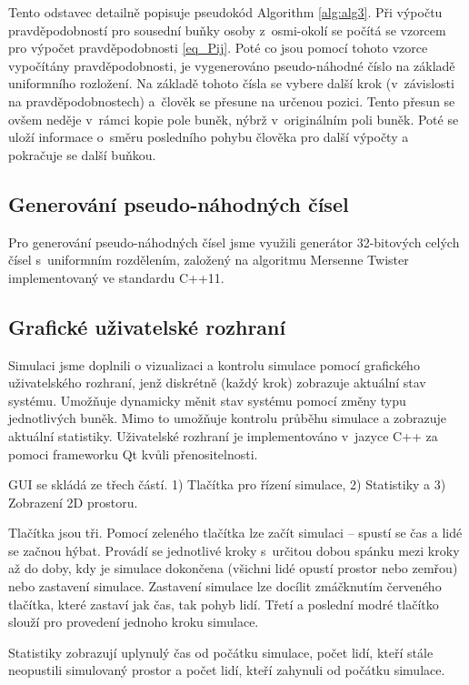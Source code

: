 \documentclass[11pt, titlepage, a4paper]{article}
\begin{document}
    Tento odstavec detailně popisuje pseudokód Algorithm \ref{alg:alg3}. Při výpočtu pravděpodobností pro sousední buňky osoby z~osmi-okolí se počítá se vzorcem pro výpočet pravděpodobnosti \ref{eq_Pij}. Poté co jsou pomocí tohoto vzorce vypočítány pravděpodobnosti, je vygenerováno pseudo-náhodné číslo na základě uniformního rozložení. Na základě tohoto čísla se vybere další krok (v~závislosti na pravděpodobnostech) a~člověk se přesune na určenou pozici. Tento přesun se ovšem neděje v~rámci kopie pole buněk, nýbrž v~originálním poli buněk. Poté se uloží informace o~směru posledního pohybu člověka pro další výpočty a pokračuje se další buňkou.
    
    
    \subsection{Generování pseudo-náhodných čísel}
    Pro generování pseudo-náhodných čísel jsme využili generátor 32-bitových celých čísel s~uniformním rozdělením, založený na algoritmu Mersenne Twister implementovaný ve standardu C++11.

    \subsection{Grafické uživatelské rozhraní}
    Simulaci jsme doplnili o vizualizaci a kontrolu simulace pomocí grafického uživatelského rozhraní, jenž diskrétně (každý krok) zobrazuje aktuální stav systému. Umožňuje dynamicky měnit stav systému pomocí změny typu jednotlivých buněk. Mimo to umožňuje kontrolu průběhu simulace a zobrazuje aktuální statistiky. Uživatelské rozhraní je implementováno v~jazyce C++ za pomoci frameworku Qt kvůli přenositelnosti.
    
    GUI se skládá ze třech částí. 1) Tlačítka pro řízení simulace, 2) Statistiky a 3) Zobrazení 2D prostoru.
    
    Tlačítka jsou tři. Pomocí zeleného tlačítka lze začít simulaci -- spustí se čas a lidé se začnou hýbat. Provádí se jednotlivé kroky s~určitou dobou spánku mezi kroky až do doby, kdy je simulace dokončena (všichni lidé opustí prostor nebo zemřou) nebo zastavení simulace. Zastavení simulace lze docílit zmáčknutím červeného tlačítka, které zastaví jak čas, tak pohyb lidí. Třetí a poslední modré tlačítko slouží pro provedení jednoho kroku simulace.
    
    Statistiky zobrazují uplynulý čas od počátku simulace, počet lidí, kteří stále neopustili simulovaný prostor a počet lidí, kteří zahynuli od počátku simulace.
    
\end{document}
